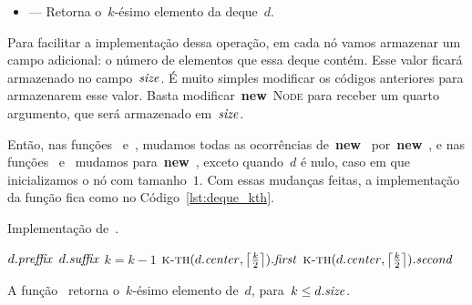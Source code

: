 \documentclass[../../main.tex]{subfiles}
\begin{document}
\begin{itemize}
    \item {} --- Retorna o~$k$-ésimo elemento da deque~$d$.
\end{itemize}

Para facilitar a implementação dessa operação, em cada nó vamos armazenar um campo adicional: o número de elementos que essa deque contém. Esse valor ficará armazenado no campo~$\mathit{size}$. É muito simples modificar os códigos anteriores para armazenarem esse valor. Basta modificar~\mbox{\textbf{new} \textsc{Node}} para receber um quarto argumento, que será armazenado em~$\mathit{size}$.

Então, nas funções~ e~, mudamos todas as ocorrências de~\mbox{\textbf{new} } por~\mbox{\textbf{new} }, e nas funções~ e~ mudamos para~\mbox{\textbf{new} }, exceto quando~$d$ é nulo, caso em que inicializamos o nó com tamanho~$1$.
Com essas mudanças feitas, a implementação da função fica como no Código~\ref{lst:deque_kth}.

\begin{algorithm}
\caption{Implementação de~.} \label{lst:deque_kth}
\begin{algorithmic}[1]

        \State \Return $d.\mathit{preffix}$\label{line:kth:if1}
    \EndIf
        \State \Return $d.\mathit{suffix}$ \label{line:kth:if2}
    \EndIf
        \State $k = k - 1$ \label{line:kth:if3}
    \EndIf
        \State \Return $\Call{k-th}{d.\V{center}, \ceil*{\frac{k}{2}}}.\V{first}$
    \Else
        \State \Return $\Call{k-th}{d.\V{center}, \ceil*{\frac{k}{2}}}.\V{second}$
    \EndIf
\EndFunction

\end{algorithmic}
\end{algorithm}


\begin{proposition}
A função~ retorna o~$k$-ésimo elemento de~$d$, para~$k \leq d.\mathit{size}$.
\end{proposition}
\end{document}
